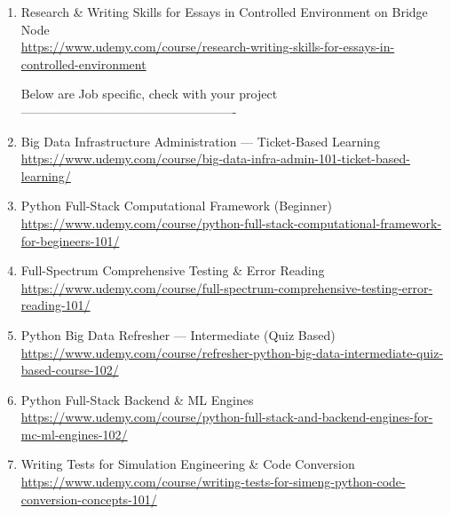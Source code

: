 \documentclass[12pt]{article}
\begin{document}
\begin{enumerate}[label=\textbf{Course \arabic*:}]
		\item Research \& Writing Skills for Essays in Controlled Environment on Bridge Node\\
		\href{https://www.udemy.com/course/research-writing-skills-for-essays-in-controlled-environment}
		{https://www.udemy.com/course/research-writing-skills-for-essays-in-controlled-environment}
		
		Below are Job specific,
		check with your project 
		----------------------------------------------------
		
		\item Big Data Infrastructure Administration — Ticket-Based Learning \\
		\href{https://www.udemy.com/course/big-data-infra-admin-101-ticket-based-learning/}
		{https://www.udemy.com/course/big-data-infra-admin-101-ticket-based-learning/}
		
		\item Python Full-Stack Computational Framework (Beginner) \\
		\href{https://www.udemy.com/course/python-full-stack-computational-framework-for-begineers-101/}
		{https://www.udemy.com/course/python-full-stack-computational-framework-for-begineers-101/}
		
		\item Full-Spectrum Comprehensive Testing \& Error Reading \\
		\href{https://www.udemy.com/course/full-spectrum-comprehensive-testing-error-reading-101/}
		{https://www.udemy.com/course/full-spectrum-comprehensive-testing-error-reading-101/}
		
		\item Python Big Data Refresher — Intermediate (Quiz Based) \\
		\href{https://www.udemy.com/course/refresher-python-big-data-intermediate-quiz-based-course-102/}
		{https://www.udemy.com/course/refresher-python-big-data-intermediate-quiz-based-course-102/}
		
		\item Python Full-Stack Backend \& ML Engines \\
		\href{https://www.udemy.com/course/python-full-stack-and-backend-engines-for-mc-ml-engines-102/}
		{https://www.udemy.com/course/python-full-stack-and-backend-engines-for-mc-ml-engines-102/}
		
		\item Writing Tests for Simulation Engineering \& Code Conversion \\
		\href{https://www.udemy.com/course/writing-tests-for-simeng-python-code-conversion-concepts-101/}
		{https://www.udemy.com/course/writing-tests-for-simeng-python-code-conversion-concepts-101/}
		

\end{enumerate}
\end{document}

